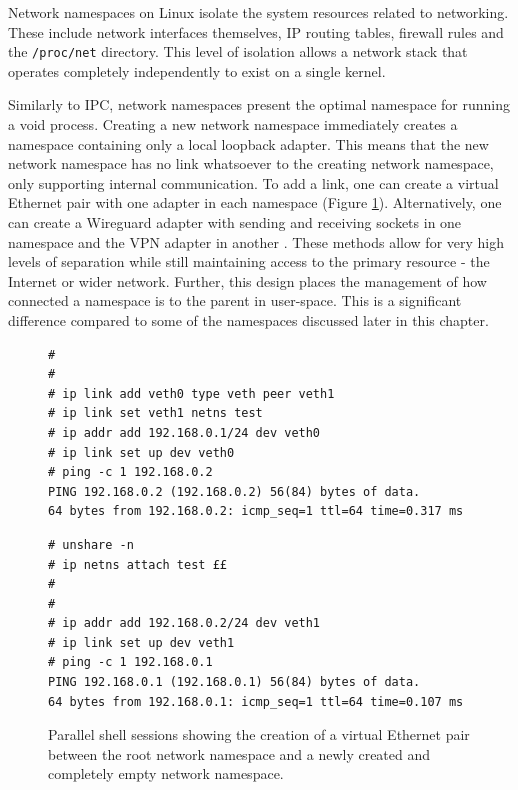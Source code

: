 \documentclass[12pt,a4paper,twoside]{report}
\begin{document}
Network namespaces on Linux isolate the system resources related to networking. These include network interfaces themselves, IP routing tables, firewall rules and the \texttt{/proc/net} directory. This level of isolation allows a network stack that operates completely independently to exist on a single kernel.

Similarly to IPC, network namespaces present the optimal namespace for running a void process. Creating a new network namespace immediately creates a namespace containing only a local loopback adapter. This means that the new network namespace has no link whatsoever to the creating network namespace, only supporting internal communication. To add a link, one can create a virtual Ethernet pair with one adapter in each namespace (Figure \ref{fig:virtual-ethernet}). Alternatively, one can create a Wireguard adapter with sending and receiving sockets in one namespace and the VPN adapter in another \citep[§7.3]{donenfeld_wireguard_2017}. These methods allow for very high levels of separation while still maintaining access to the primary resource - the Internet or wider network. Further, this design places the management of how connected a namespace is to the parent in user-space. This is a significant difference compared to some of the namespaces discussed later in this chapter.

\begin{figure}
\begin{minipage}{.49\textwidth}

\begin{verbatim}
#
#
# ip link add veth0 type veth peer veth1
# ip link set veth1 netns test
# ip addr add 192.168.0.1/24 dev veth0
# ip link set up dev veth0
# ping -c 1 192.168.0.2
PING 192.168.0.2 (192.168.0.2) 56(84) bytes of data.
64 bytes from 192.168.0.2: icmp_seq=1 ttl=64 time=0.317 ms
\end{verbatim}

\end{minipage}\hfill
\begin{minipage}{.49\textwidth}

\begin{verbatim}
# unshare -n
# ip netns attach test ££
#
#
# ip addr add 192.168.0.2/24 dev veth1
# ip link set up dev veth1
# ping -c 1 192.168.0.1
PING 192.168.0.1 (192.168.0.1) 56(84) bytes of data.
64 bytes from 192.168.0.1: icmp_seq=1 ttl=64 time=0.107 ms
\end{verbatim}

\end{minipage}

\caption{Parallel shell sessions showing the creation of a virtual Ethernet pair between the root network namespace and a newly created and completely empty network namespace.}
\label{fig:virtual-ethernet}
\end{figure}
\end{document}
